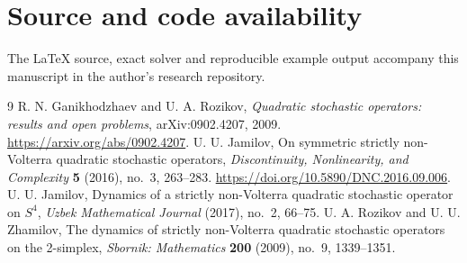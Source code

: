\documentclass[11pt]{amsart}
\theoremstyle{definition}
\begin{document}
\section*{Source and code availability}
The \LaTeX{} source, exact solver and reproducible example output accompany this manuscript in the author's research repository.

\begin{thebibliography}{9}
 R. N. Ganikhodzhaev and U. A. Rozikov, \emph{Quadratic stochastic operators: results and open problems}, arXiv:0902.4207, 2009. \url{https://arxiv.org/abs/0902.4207}.
 U. U. Jamilov, On symmetric strictly non-Volterra quadratic stochastic operators, \emph{Discontinuity, Nonlinearity, and Complexity} \textbf{5} (2016), no.~3, 263--283. \url{https://doi.org/10.5890/DNC.2016.09.006}.
 U. U. Jamilov, Dynamics of a strictly non-Volterra quadratic stochastic operator on $S^4$, \emph{Uzbek Mathematical Journal} (2017), no.~2, 66--75.
 U. A. Rozikov and U. U. Zhamilov, The dynamics of strictly non-Volterra quadratic stochastic operators on the 2-simplex, \emph{Sbornik: Mathematics} \textbf{200} (2009), no.~9, 1339--1351.
\end{thebibliography}
\end{document}
